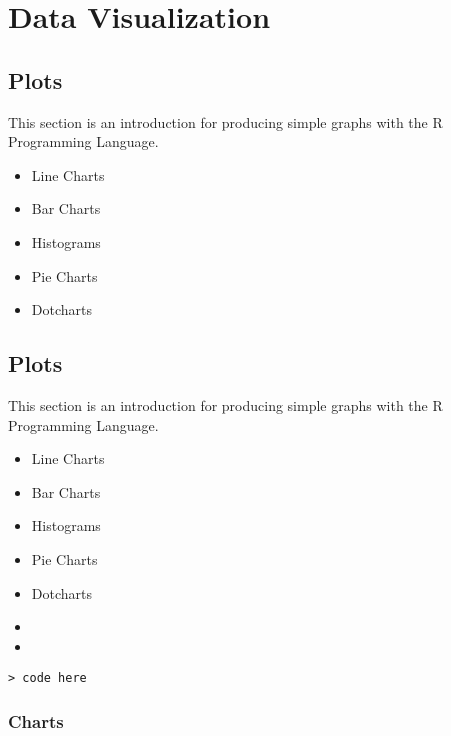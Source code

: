 


\newpage


\chapter{Data Visualization}
\section{Plots}
This section is an introduction for producing simple graphs with
the R Programming Language.
\begin{itemize}
	\item Line Charts  \item Bar Charts \item Histograms \item Pie
	Charts \item Dotcharts
\end{itemize}



\section{Plots}
This section is an introduction for producing simple graphs with
the R Programming Language.
\begin{itemize}
\item Line Charts  \item Bar Charts \item Histograms \item Pie
Charts \item Dotcharts
\end{itemize}


\begin{itemize}
\item
\item
\end{itemize}
\footnotesize \begin{verbatim}
> code here
 \end{verbatim}\normalsize


\subsection{ Charts}

